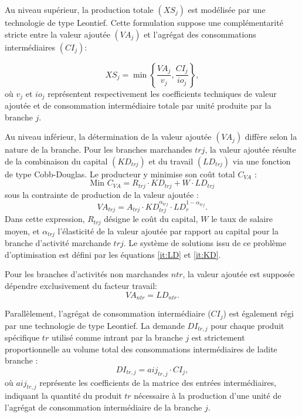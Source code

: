 \documentclass[11pt,a4paper]{article}
\newcommand{\trj}{\mathit{trj}}
\newcommand{\aij}{\mathit{aij}}
\newcommand{\CI}{\mathit{CI}}
\newcommand{\DI}{\mathit{DI}}
\newcommand{\io}{\mathit{io}}
\newcommand{\KD}{\mathit{KD}}
\newcommand{\LD}{\mathit{LD}}
\newcommand{\ntr}{\mathit{ntr}}
\newcommand{\tr}{\mathit{tr}}
\newcommand{\VA}{\mathit{VA}}
\newcommand{\XS}{\mathit{XS}}
\begin{document}
	
	
	Au niveau supérieur, la production totale $\left(\XS_{j}\right)$ est modélisée par une technologie de type Leontief. Cette formulation suppose une complémentarité stricte entre la valeur ajoutée $\left(\VA_{j}\right)$ et l'agrégat des consommations intermédiaires $\left(\CI_{j}\right)$: 
	
	\begin{equation*}
		\XS_{j} = \min\left\{\frac{\VA_{j}}{v_{j}},\frac{\CI_{j}}{\io_{j}}\right\}, 
	\end{equation*}	
	où $v_{j}$ et $\io_{j}$ représentent respectivement les coefficients techniques de valeur ajoutée et de consommation intermédiaire totale par unité produite par la branche $j$.
	
	Au niveau inférieur, la détermination de la valeur ajoutée $\left(\VA_{j}\right)$ diffère selon la nature de la branche. Pour les {branches marchandes} $\trj$, la valeur ajoutée résulte de la combinaison du capital $\left(\KD_{\trj}\right)$ et du travail $\left(\LD_{\trj}\right)$ via une fonction de type Cobb-Douglas. Le producteur y minimise son coût total $C_{\VA}$ :
	\begin{equation*}
		\text{Min } C_{\VA} = R_{\trj} \cdot \KD_{\trj} + W \cdot \LD_{\trj}
	\end{equation*}
	sous la contrainte de production de la valeur ajoutée :
	\begin{equation*}
		\VA_{\trj} = A_{\trj} \cdot \KD_{\trj}^{\alpha_{\trj}} \cdot \LD_{r}^{1-\alpha_{\trj}}.
	\end{equation*}
	Dans cette expression, $R_{\trj}$ désigne le coût du capital, $W$ le taux de salaire moyen, et $\alpha_{\trj}$ l'élasticité de la valeur ajoutée par rapport au capital pour la branche d'activité marchande $\trj$. Le système de solutions issu de ce problème d'optimisation est défini par les équations \ref{it:LD} et \ref{it:KD}.
	
	Pour les branches d'activités non marchandes $\ntr$, la valeur ajoutée est supposée dépendre exclusivement du facteur travail:
	\begin{equation*}
		\VA_{\ntr} =\LD_{\ntr}.
	\end{equation*}
	
	
	Parallèlement, l'agrégat de consommation intermédiaire ($\CI_{j}$) est également régi par une technologie de type Leontief. La demande $\DI_{\tr,j}$ pour chaque produit spécifique $\tr$ utilisé comme intrant par la branche $j$ est strictement proportionnelle au volume total des consommations intermédiaires de ladite branche :
	\begin{equation*}
		\DI_{\tr,j} = \aij_{\tr,j}\cdot \CI_j,
	\end{equation*}
	où $\aij_{\tr,j}$ représente les coefficients de la matrice des entrées intermédiaires, indiquant la quantité du produit $\tr$ nécessaire à la production d'une unité de l'agrégat de consommation intermédiaire de la branche $j$. 
	
\end{document}
